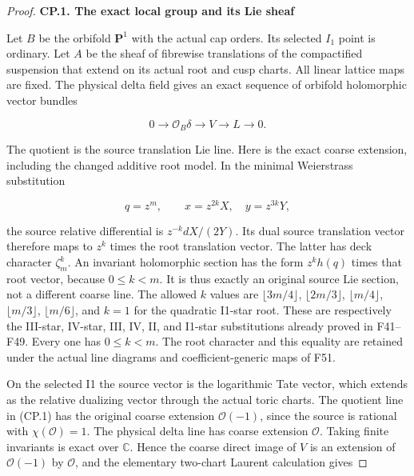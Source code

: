 \begin{proof}
\par

\medskip\noindent\textbf{CP.1. The exact local group and its Lie sheaf}

\par\nobreak

Let \(B\) be the orbifold \(\mathbf P^1\) with the actual cap orders. Its selected \(I_1\)
point is ordinary. Let \(A\) be the sheaf of fibrewise translations of the
compactified suspension that extend on its actual root and cusp charts.
All linear lattice maps are fixed. The physical delta field gives an
exact sequence of orbifold holomorphic vector bundles

\[
 0\longrightarrow\mathcal O_B\delta\longrightarrow V
       \longrightarrow L\longrightarrow0.                 \tag{CP.1}
\]

The quotient is the source translation Lie line. Here is the exact
coarse extension, including the changed additive root model. In the
minimal Weierstrass substitution

\[
 q=z^m,\qquad x=z^{2k}X,\quad y=z^{3k}Y,
\]

the source relative differential is \(z^{-k}dX/(2Y)\). Its dual source
translation vector therefore maps to \(z^k\) times the root translation
vector. The latter has deck character \(\zeta_m^k\). An invariant holomorphic
section has the form \(z^k h(q)\) times that root vector, because \(0\leq k<m\).
It is thus exactly an original source Lie section, not a different
coarse line. The allowed \(k\) values are \(\lfloor3m/4\rfloor\), \(\lfloor2m/3\rfloor\),
\(\lfloor m/4\rfloor\), \(\lfloor m/3\rfloor\), \(\lfloor m/6\rfloor\), and \(k=1\) for the quadratic I1-star
root. These are respectively the III-star, IV-star, III, IV, II, and
I1-star substitutions already proved in F41--F49. Every one has
\(0\leq k<m\). The root character and this equality are retained under the
actual line diagrams and coefficient-generic maps of F51.

On the selected I1 the source vector is the logarithmic Tate vector,
which extends as the relative dualizing vector through the actual
toric charts. The quotient line in (CP.1) has the original coarse
extension \(\mathcal O(-1)\), since the source is rational with \(\chi(\mathcal O)=1\). The
physical delta line has coarse extension \(\mathcal O\). Taking finite invariants
is exact over \(\mathbb C\). Hence the coarse direct image of \(V\) is an extension
of \(\mathcal O(-1)\) by \(\mathcal O\), and the elementary two-chart Laurent calculation gives


\end{proof}
